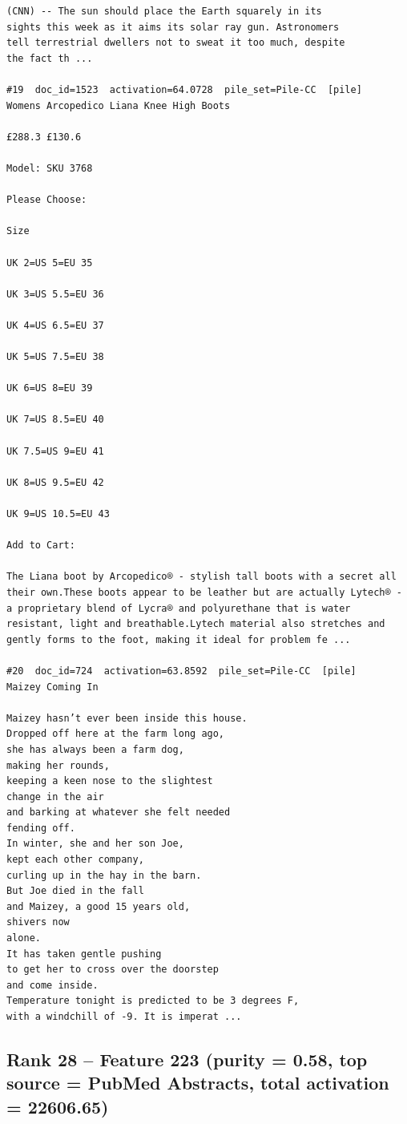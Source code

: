 \begin{verbatim}
(CNN) -- The sun should place the Earth squarely in its
sights this week as it aims its solar ray gun. Astronomers
tell terrestrial dwellers not to sweat it too much, despite
the fact th ...

#19  doc_id=1523  activation=64.0728  pile_set=Pile-CC  [pile]
Womens Arcopedico Liana Knee High Boots

£288.3 £130.6

Model: SKU 3768

Please Choose:

Size

UK 2=US 5=EU 35

UK 3=US 5.5=EU 36

UK 4=US 6.5=EU 37

UK 5=US 7.5=EU 38

UK 6=US 8=EU 39

UK 7=US 8.5=EU 40

UK 7.5=US 9=EU 41

UK 8=US 9.5=EU 42

UK 9=US 10.5=EU 43

Add to Cart:

The Liana boot by Arcopedico® - stylish tall boots with a secret all their own.These boots appear to be leather but are actually Lytech® - a proprietary blend of Lycra® and polyurethane that is water resistant, light and breathable.Lytech material also stretches and gently forms to the foot, making it ideal for problem fe ...

#20  doc_id=724  activation=63.8592  pile_set=Pile-CC  [pile]
Maizey Coming In

Maizey hasn’t ever been inside this house.
Dropped off here at the farm long ago,
she has always been a farm dog,
making her rounds,
keeping a keen nose to the slightest
change in the air
and barking at whatever she felt needed
fending off.
In winter, she and her son Joe,
kept each other company,
curling up in the hay in the barn.
But Joe died in the fall
and Maizey, a good 15 years old,
shivers now
alone.
It has taken gentle pushing
to get her to cross over the doorstep
and come inside.
Temperature tonight is predicted to be 3 degrees F,
with a windchill of -9. It is imperat ...

\end{verbatim}

\subsection*{Rank 28 -- Feature 223 (purity = 0.58, top source = PubMed Abstracts, total activation = 22606.65)}

